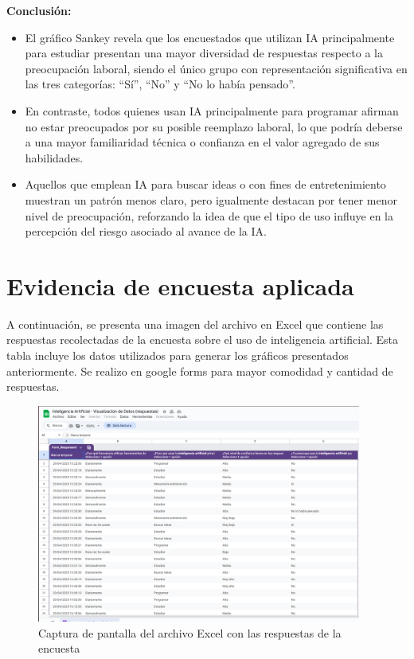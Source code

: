 \documentclass[12pt, a4paper]{article}
\begin{document}
\textbf{Conclusión:}  
\begin{itemize}
    \item El gráfico Sankey revela que los encuestados que utilizan IA principalmente para estudiar presentan una mayor diversidad de respuestas respecto a la preocupación laboral, siendo el único grupo con representación significativa en las tres categorías: “Sí”, “No” y “No lo había pensado”.
    \item En contraste, todos quienes usan IA principalmente para programar afirman no estar preocupados por su posible reemplazo laboral, lo que podría deberse a una mayor familiaridad técnica o confianza en el valor agregado de sus habilidades.
    \item Aquellos que emplean IA para buscar ideas o con fines de entretenimiento muestran un patrón menos claro, pero igualmente destacan por tener menor nivel de preocupación, reforzando la idea de que el tipo de uso influye en la percepción del riesgo asociado al avance de la IA.

\end{itemize}

\section{Evidencia de encuesta aplicada}

A continuación, se presenta una imagen del archivo en Excel que contiene las respuestas recolectadas de la encuesta sobre el uso de inteligencia artificial. Esta tabla incluye los datos utilizados para generar los gráficos presentados anteriormente. Se realizo en google forms para mayor comodidad y cantidad de respuestas. 

\begin{figure}[H]
    \centering
    \includegraphics[width=0.95\textwidth]{Graficos/excel.png} %
    \caption{Captura de pantalla del archivo Excel con las respuestas de la encuesta}
\end{figure}
\end{document}
